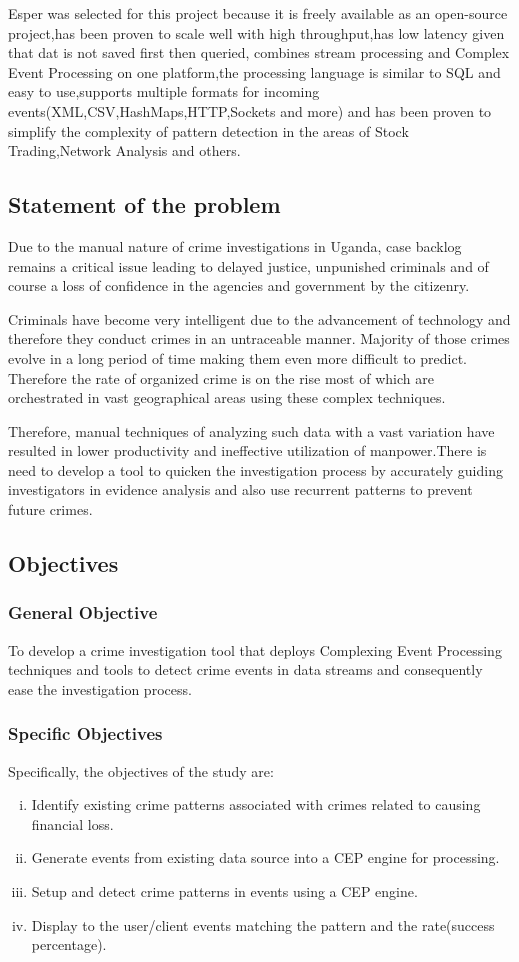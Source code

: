 \noindent Esper was selected for this project because it is freely available as an open-source project,has been proven to scale well with high throughput,has low latency given that dat is not saved first then queried, combines stream processing and Complex Event Processing on one platform,the processing language is similar to SQL and easy to use,supports multiple formats for incoming events(XML,CSV,HashMaps,HTTP,Sockets and more) and has been proven \cite{twentyfive} to simplify the complexity of pattern detection in the areas of Stock Trading,Network Analysis and others.
\newpage
\subsection{Statement of the problem}
\noindent Due to the manual nature of crime investigations in Uganda, case backlog remains a critical issue leading to delayed justice, unpunished criminals and of course a loss of confidence in the agencies and government by the citizenry.

\noindent Criminals have become very intelligent due to the advancement of technology and therefore they conduct crimes in an untraceable manner. Majority of those crimes evolve in a long period of time making them even more difficult to predict. Therefore the rate of organized crime is on the rise most of which are orchestrated in vast geographical areas using these complex techniques.

\noindent Therefore, manual techniques of analyzing such data with a vast variation have resulted in lower productivity and ineffective utilization of manpower\cite{three}.There is need to develop a tool to quicken the investigation process by accurately guiding investigators in evidence analysis and also use recurrent patterns to prevent future crimes.

\subsection{Objectives}
\subsubsection{General Objective}
To develop a crime investigation tool that deploys Complexing Event Processing techniques and tools to detect crime events in data streams and consequently ease the investigation process.
\subsubsection{Specific Objectives}
Specifically, the objectives of the study are:
\begin{enumerate}[(i)]
\item Identify existing crime patterns associated with crimes related to causing financial loss.
\item Generate events from existing data source into a CEP engine for processing.
\item Setup and detect crime patterns in events using a CEP engine.
\item Display to the user/client events matching the pattern and the rate(success percentage).
 \end{enumerate}
